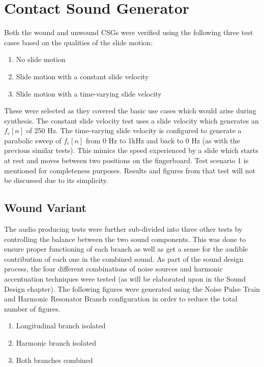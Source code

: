 \documentclass[../main.tex]{subfiles}
\begin{document}
\section{Contact Sound Generator}
Both the wound and unwound CSGs were verified using the following three test cases based on the qualities of the slide motion:

\begin{enumerate}
    \item No slide motion
    \item Slide motion with a constant slide velocity
    \item Slide motion with a time-varying slide velocity
\end{enumerate}

These were selected as they covered the basic use cases which would arise during synthesis. The constant slide velocity test uses a slide velocity which generates an $f_c[n]$ of 250 Hz. The time-varying slide velocity is configured to generate a parabolic sweep of $f_c[n]$ from 0 Hz to 1kHz and back to 0 Hz (as with the previous similar tests). This mimics the speed experienced by a slide which starts at rest and moves between two positions on the fingerboard. Test scenario 1 is mentioned for completeness purposes. Results and figures from that test will not be discussed due to its simplicity.

\subsection{Wound Variant}
The audio producing tests were further sub-divided into three other tests by controlling the balance between the two sound components. This was done to ensure proper functioning of each branch as well as get a sense for the audible contribution of each one in the combined sound. As part of the sound design process, the four different combinations of noise sources and harmonic accentuation techniques were tested (as will be elaborated upon in the Sound Design chapter). The following figures were generated using the Noise Pulse Train and Harmonic Resonator Branch configuration in order to reduce the total number of figures.

\begin{enumerate}
    \item Longitudinal branch isolated
    \item Harmonic branch isolated
    \item Both branches combined
\end{enumerate}
\end{document}
